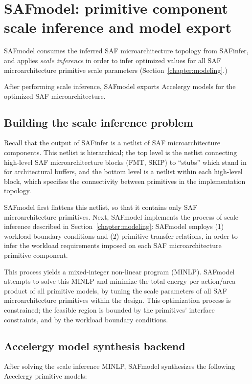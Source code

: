 \section{SAFmodel: primitive component scale inference and model export}

SAFmodel consumes the inferred SAF microarchitecture topology from SAFinfer, and applies \textit{scale inference} in order to infer optimized values for all SAF microarchitecture primitive scale parameters (Section~\ref{chapter:modeling}.)

After performing scale inference, SAFmodel exports Accelergy models for the optimized SAF microarchitecture.

\subsection{Building the scale inference problem}

Recall that the output of SAFinfer is a netlist of SAF microarchitecture components. This netlist is hierarchical; the top level is the netlist connecting high-level SAF microarchitecture blocks (FMT, SKIP) to ``stubs'' which stand in for architectural buffers, and the bottom level is a netlist within each high-level block, which specifies the connectivity between primitives in the implementation topology.

SAFmodel first flattens this netlist, so that it contains only SAF microarchitecture primitives. Next, SAFmodel implements the process of scale inference described in Section~\ref{chapter:modeling}: SAFmodel employs (1) workload boundary conditions and (2) primitive transfer relations, in order to infer the workload requirements imposed on each SAF microarchitecture primitive component.

This process yields a mixed-integer non-linear program (MINLP). SAFmodel attempts to solve this MINLP and minimize the total energy-per-action/area product of all primitive models, by tuning the scale parameters of all SAF microarchitecture primitives within the design. This optimization process is constrained; the feasible region is bounded by the primitives' interface constraints, and by the workload boundary conditions.

\subsection{Accelergy model synthesis backend}

After solving the scale inference MINLP, SAFmodel synthesizes the following Accelergy primitive models:


